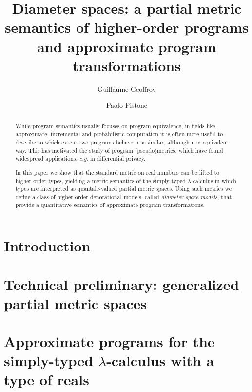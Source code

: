 \documentclass[a4paper,UKenglish,cleveref, autoref, english, thm-restate]{lipics-v2019}
\title{Diameter spaces: a partial metric semantics of higher-order programs and approximate program transformations} %
\author{Guillaume Geoffroy}
{Universit\`a di Bologna, Dipartimento Informatica-Scienza e Ingegneria, Italy}
{guillaume.geoffroy@unibo.it} 
{}
{}
\author{Paolo Pistone}
{Universit\`a di Bologna, Dipartimento Informatica-Scienza e Ingegneria, Italy}
{paolo.pistone2@unibo.it} 
{}
{}
\begin{document}
\maketitle

\begin{abstract}

While program semantics usually focuses on program equivalence, in fields like approximate, incremental and probabilistic computation it is often more useful to describe to which extent two programs behave in a similar, although non equivalent way. This has motivated the study of program (pseudo)metrics, which have found widespread applications, \textit{e.g.} in differential privacy. 

In this paper we show that the standard metric on real numbers can be lifted to higher-order types, yielding a metric semantics of the simply typed $\lambda$-calculus in which types are interpreted as quantale-valued partial metric spaces.
Using such metrics we define a class of higher-order denotational models, called \emph{diameter space models}, that provide a quantitative semantics of approximate program transformations.


%

\end{abstract}


\section{Introduction}




\section{Technical preliminary: generalized partial metric spaces}



\section{Approximate programs for the simply-typed $\lambda$-calculus with a type of reals}
\label{section:stlc}
\end{document}
